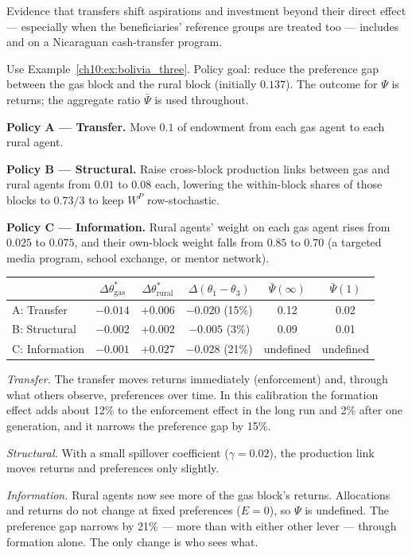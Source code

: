\documentclass[../structural_economics_book.tex]{subfiles}
\begin{document}
Evidence that transfers shift aspirations and investment beyond their direct effect --- especially when the beneficiaries' reference groups are treated too --- includes \citet[\textit{EJ}]{macours2014changing} and \citet[\textit{AEJ: Applied}]{macours2012cash} on a Nicaraguan cash-transfer program.

\begin{example}\label{ch10:ex:policies}
Use Example~\ref{ch10:ex:bolivia_three}. Policy goal: reduce the preference gap between the gas block and the rural block (initially $0.137$). The outcome for $\Psi$ is returns; the aggregate ratio $\bar{\Psi}$ is used throughout.

\textbf{Policy A --- Transfer.} Move $0.1$ of endowment from each gas agent to each rural agent.

\textbf{Policy B --- Structural.} Raise cross-block production links between gas and rural agents from $0.01$ to $0.08$ each, lowering the within-block shares of those blocks to $0.73/3$ to keep $W^P$ row-stochastic.

\textbf{Policy C --- Information.} Rural agents' weight on each gas agent rises from $0.025$ to $0.075$, and their own-block weight falls from $0.85$ to $0.70$ (a targeted media program, school exchange, or mentor network).

\begin{center}
\begin{tabular}{lccccc}
\toprule
& $\Delta\theta^*_{\text{gas}}$ & $\Delta\theta^*_{\text{rural}}$ & $\Delta(\theta_1 - \theta_3)$ & $\bar{\Psi}(\infty)$ & $\bar{\Psi}(1)$ \\
\midrule
A: Transfer & $-0.014$ & $+0.006$ & $-0.020$ (15\%) & 0.12 & 0.02 \\
B: Structural & $-0.002$ & $+0.002$ & $-0.005$ (3\%) & 0.09 & 0.01 \\
C: Information & $-0.001$ & $+0.027$ & $-0.028$ (21\%) & undefined & undefined \\
\bottomrule
\end{tabular}
\end{center}

\textit{Transfer.} The transfer moves returns immediately (enforcement) and, through what others observe, preferences over time. In this calibration the formation effect adds about 12\% to the enforcement effect in the long run and 2\% after one generation, and it narrows the preference gap by 15\%.

\textit{Structural.} With a small spillover coefficient ($\gamma = 0.02$), the production link moves returns and preferences only slightly.

\textit{Information.} Rural agents now see more of the gas block's returns. Allocations and returns do not change at fixed preferences ($E = 0$), so $\Psi$ is undefined. The preference gap narrows by 21\% --- more than with either other lever --- through formation alone. The only change is who sees what.
\end{example}
\end{document}
